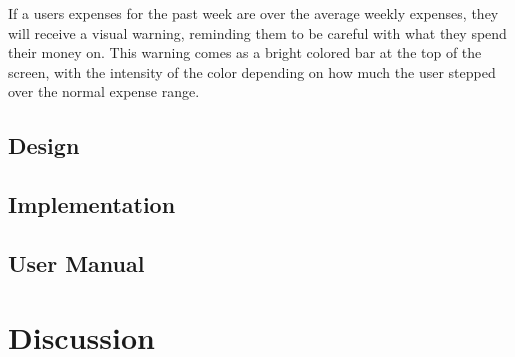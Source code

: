 If a users expenses for the past week are over the average weekly expenses, they will receive a visual warning, reminding them to be careful with what they spend their money on. This warning comes as a bright colored bar at the top of the screen, with the intensity of the color depending on how much the user stepped over the normal expense range. 
\subsection{Design}
\subsection{Implementation}
\subsection{User Manual}
\label{sec:manual}
\section{Discussion}